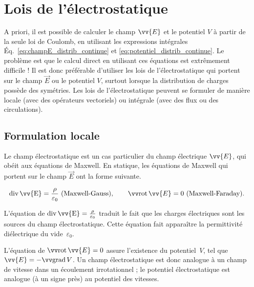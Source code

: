 \documentclass[12pt,fancy]{cours}
\begin{document}



\section{Lois de l’électrostatique}
\label{sec:lois}
A priori, il est possible de calculer le champ $\vv{E}$ et le potentiel $V$ à partir de la seule loi de Coulomb, en utilisant les expressions intégrales Éq.~\eqref{eq:champE_distrib_continue} et \eqref{eq:potentiel_distrib_continue}. Le problème est que le calcul direct en utilisant ces équations est extrêmement difficile ! Il est donc préférable d'utiliser les lois de l’électrostatique qui portent sur le champ $\Vec{E}$ ou le potentiel $V$, surtout lorsque la distribution de charges possède des symétries. Les lois de l’électrostatique peuvent se formuler de manière locale (avec des opérateurs vectoriels) ou intégrale (avec des flux ou des circulations).

\subsection{Formulation locale}
\label{sec:éqs_Maxwell}

Le champ électrostatique est un cas particulier du champ électrique $\vv{E}$, qui obéit aux équations de Maxwell. En statique, les équations de Maxwell qui portent sur le champ $\Vec{E}$ ont la forme suivante.

\begin{theorem}
\begin{equation*}
\Dive{\vv{E}}=\frac{\rho}{\varepsilon_0} \text{ (Maxwell-Gauss)}, \qquad
\Rot{\vv{E}}=0 \text{ (Maxwell-Faraday)}.
\end{equation*}
\end{theorem}
\begin{liste}
  \item
  L'équation de  $\Dive{\vv{E}}=\frac{\rho}{\varepsilon_0}$ traduit le fait que  les charges électriques sont les sources du champ électrostatique. Cette équation fait apparaître la permittivité diélectrique du vide~$\varepsilon_0$. 
  \item L'équation de  $\rot{\vv{E}}=0$ assure l’existence du potentiel~$V$, tel que $\vv{E}=-\grad{V}$. Un champ électrostatique est donc analogue à un champ de vitesse dans un écoulement irrotationnel ; le potentiel électrostatique est analogue (à un signe près) au potentiel des vitesses.
\end{liste}
  
\end{document}
